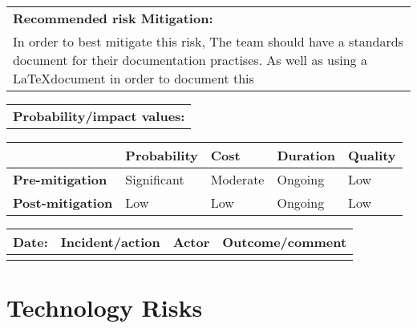 \begin{table}
\begin{tabularx}{\textwidth}{| X |}
	\end{tabularx}
	\begin{tabularx}{\textwidth}{| X |}
		\hline
		\textbf{Recommended risk Mitigation:} \\ In order to best mitigate this risk, The team should have a standards document for their documentation practises. As well as using a \LaTeX document in order to document this \\
	\end{tabularx}
	\begin{tabularx}{\textwidth}{| X |}
		\hline
		\textbf{Probability/impact values:} \\
	\end{tabularx}
	\begin{tabularx}{\textwidth}{| l | l | X | X | X |}
		\hline
		 &  \textbf{Probability} & \textbf{Cost} & \textbf{Duration} & \textbf{Quality} \\ \hline
		\textbf{Pre-mitigation} & Significant & Moderate & Ongoing & Low \\ \hline
		\textbf{Post-mitigation} & Low & Low & Ongoing & Low \\ \hline \hline
	\end{tabularx}
	\begin{tabularx}{\textwidth}{| l | X | l | X |}
		\hline
		\textbf{Date:} & \textbf{Incident/action} & \textbf{Actor} & \textbf{Outcome/comment} \\ \hline
		 &  &  &  \\ \hline
	\end{tabularx}%
\end{table}

\FloatBarrier

\section{Technology Risks}
\label{Technology_Risks}

\FloatBarrier

